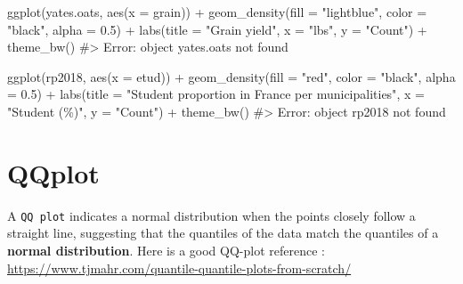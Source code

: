 \documentclass[
  letterpaper,
  DIV=11,
  numbers=noendperiod]{scrreprt}
\newenvironment{Shaded}{\begin{snugshade}}{\end{snugshade}}
\newcommand{\AttributeTok}[1]{\textcolor[rgb]{0.40,0.45,0.13}{#1}}
\newcommand{\CommentTok}[1]{\textcolor[rgb]{0.37,0.37,0.37}{#1}}
\newcommand{\FloatTok}[1]{\textcolor[rgb]{0.68,0.00,0.00}{#1}}
\newcommand{\FunctionTok}[1]{\textcolor[rgb]{0.28,0.35,0.67}{#1}}
\newcommand{\NormalTok}[1]{\textcolor[rgb]{0.00,0.23,0.31}{#1}}
\newcommand{\SpecialCharTok}[1]{\textcolor[rgb]{0.37,0.37,0.37}{#1}}
\newcommand{\StringTok}[1]{\textcolor[rgb]{0.13,0.47,0.30}{#1}}
\begin{document}
\begin{Shaded}
\begin{Highlighting}[]

\FunctionTok{ggplot}\NormalTok{(yates.oats, }\FunctionTok{aes}\NormalTok{(}\AttributeTok{x =}\NormalTok{ grain)) }\SpecialCharTok{+}
  \FunctionTok{geom\_density}\NormalTok{(}\AttributeTok{fill =} \StringTok{"lightblue"}\NormalTok{,}
                 \AttributeTok{color =} \StringTok{"black"}\NormalTok{,}
                 \AttributeTok{alpha =} \FloatTok{0.5}\NormalTok{) }\SpecialCharTok{+}
  \FunctionTok{labs}\NormalTok{(}\AttributeTok{title =} \StringTok{"Grain yield"}\NormalTok{, }
       \AttributeTok{x =} \StringTok{"lbs"}\NormalTok{, }
       \AttributeTok{y =} \StringTok{"Count"}\NormalTok{) }\SpecialCharTok{+} 
  \FunctionTok{theme\_bw}\NormalTok{()}
\CommentTok{\#\textgreater{} Error: object \textquotesingle{}yates.oats\textquotesingle{} not found}


\FunctionTok{ggplot}\NormalTok{(rp2018, }\FunctionTok{aes}\NormalTok{(}\AttributeTok{x =}\NormalTok{ etud)) }\SpecialCharTok{+}
  \FunctionTok{geom\_density}\NormalTok{(}\AttributeTok{fill =} \StringTok{"red"}\NormalTok{,}
                 \AttributeTok{color =} \StringTok{"black"}\NormalTok{,}
                 \AttributeTok{alpha =} \FloatTok{0.5}\NormalTok{) }\SpecialCharTok{+} 
  \FunctionTok{labs}\NormalTok{(}\AttributeTok{title =} \StringTok{"Student proportion in France per municipalities"}\NormalTok{, }
       \AttributeTok{x =} \StringTok{"Student (\%)"}\NormalTok{, }
       \AttributeTok{y =} \StringTok{"Count"}\NormalTok{) }\SpecialCharTok{+} 
  \FunctionTok{theme\_bw}\NormalTok{() }
\CommentTok{\#\textgreater{} Error: object \textquotesingle{}rp2018\textquotesingle{} not found}
\end{Highlighting}
\end{Shaded}

\section{QQplot}\label{qqplot}

A \texttt{QQ\ plot} indicates a normal distribution when the points
closely follow a straight line, suggesting that the quantiles of the
data match the quantiles of a \textbf{normal distribution}. Here is a
good QQ-plot reference :
\url{https://www.tjmahr.com/quantile-quantile-plots-from-scratch/}
\end{document}
